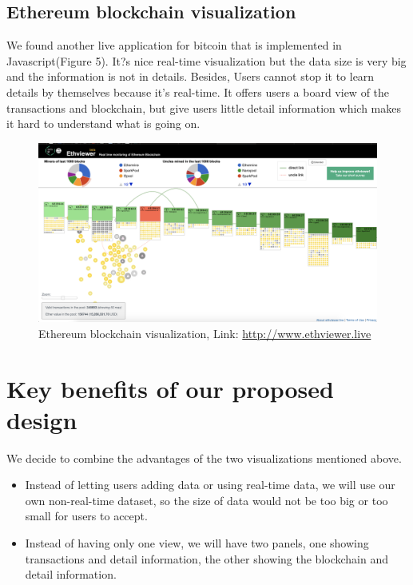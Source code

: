 \documentclass[journal, a4paper]{IEEEtran}
\begin{document}
\subsection{Ethereum blockchain visualization}
We found another live application for bitcoin that is implemented in Javascript(Figure 5). It?s nice real-time visualization but the data size is very big and the information is not in details. Besides, Users cannot stop it to learn details by themselves because it's real-time. It offers users a board view of the transactions and blockchain, but give users little detail information which makes it hard to understand what is going on.
\begin{figure}[!hbt]
		\begin{center}
		\includegraphics[width=\columnwidth]{ethereum.png}
		\caption{Ethereum blockchain visualization, Link: \href{http://www.ethviewer.live}{http://www.ethviewer.live}}
		\label{fig:Ethereum blockchain visualization}
		\end{center}
	\end{figure}

\section{Key benefits of our proposed design}
We decide to combine the advantages of the two visualizations mentioned above.
\begin{itemize}
    \item Instead of letting users adding data or using real-time data, we will use our own non-real-time dataset, so the size of data would not be too big or too small for users to accept.
    \item Instead of having only one view, we will have two panels, one showing transactions and detail information, the other showing the blockchain and detail information.
\end{itemize}
\end{document}
